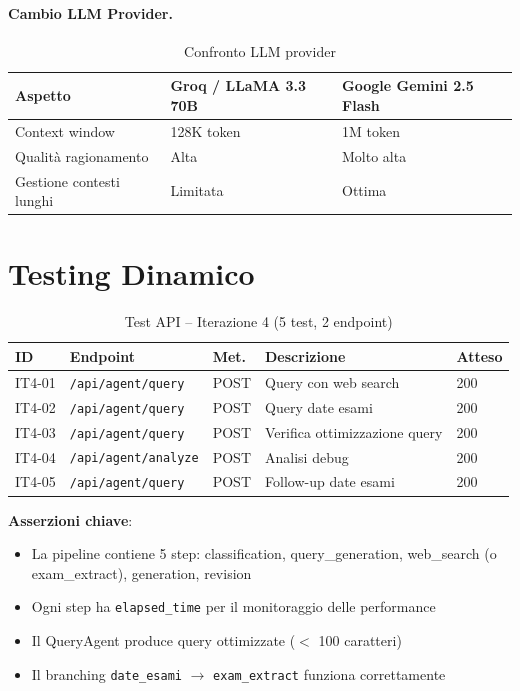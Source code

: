 \documentclass[a4paper,12pt]{report}
\begin{document}
\paragraph{Cambio LLM Provider.}

\begin{table}[H]
\centering
\begin{tabularx}{\textwidth}{l X X}
\toprule
\textbf{Aspetto} & \textbf{Groq / LLaMA 3.3 70B} & \textbf{Google Gemini 2.5 Flash} \\
\midrule
Context window & 128K token & 1M token \\
Qualità ragionamento & Alta & Molto alta \\
Gestione contesti lunghi & Limitata & Ottima \\
\bottomrule
\end{tabularx}
\caption{Confronto LLM provider}
\end{table}

\section{Testing Dinamico}

\begin{table}[H]
\centering
\small
\begin{tabularx}{\textwidth}{l l l X l}
\toprule
\textbf{ID} & \textbf{Endpoint} & \textbf{Met.} & \textbf{Descrizione} & \textbf{Atteso} \\
\midrule
IT4-01 & \texttt{/api/agent/query} & POST & Query con web search & 200 \\
IT4-02 & \texttt{/api/agent/query} & POST & Query date esami & 200 \\
IT4-03 & \texttt{/api/agent/query} & POST & Verifica ottimizzazione query & 200 \\
IT4-04 & \texttt{/api/agent/analyze} & POST & Analisi debug & 200 \\
IT4-05 & \texttt{/api/agent/query} & POST & Follow-up date esami & 200 \\
\bottomrule
\end{tabularx}
\caption{Test API -- Iterazione 4 (5 test, 2 endpoint)}
\end{table}

\textbf{Asserzioni chiave}:
\begin{itemize}
    \item La pipeline contiene 5 step: classification, query\_generation, web\_search (o exam\_extract), generation, revision
    \item Ogni step ha \texttt{elapsed\_time} per il monitoraggio delle performance
    \item Il QueryAgent produce query ottimizzate ($<$ 100 caratteri)
    \item Il branching \texttt{date\_esami} $\rightarrow$ \texttt{exam\_extract} funziona correttamente
\end{itemize}
\end{document}
